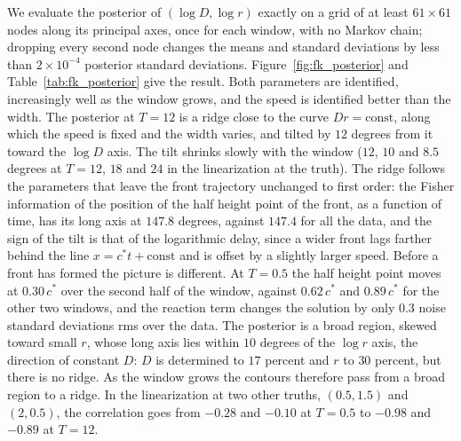We evaluate the posterior of $(\log D,\log r)$ exactly on a grid of at least $61\times61$ nodes along its principal axes, once for each window, with no Markov chain; dropping every second node changes the means and standard deviations by less than $2\times10^{-4}$ posterior standard deviations. Figure~\ref{fig:fk_posterior} and Table~\ref{tab:fk_posterior} give the result. Both parameters are identified, increasingly well as the window grows, and the speed is identified better than the width. The posterior at $T=12$ is a ridge close to the curve $Dr=\mathrm{const}$, along which the speed is fixed and the width varies, and tilted by $12$ degrees from it toward the $\log D$ axis. The tilt shrinks slowly with the window ($12$, $10$ and $8.5$ degrees at $T=12$, $18$ and $24$ in the linearization at the truth). The ridge follows the parameters that leave the front trajectory unchanged to first order: the Fisher information of the position of the half height point of the front, as a function of time, has its long axis at $147.8$ degrees, against $147.4$ for all the data, and the sign of the tilt is that of the logarithmic delay, since a wider front lags farther behind the line $x=c^*t+\mathrm{const}$ and is offset by a slightly larger speed. Before a front has formed the picture is different. At $T=0.5$ the half height point moves at $0.30\,c^*$ over the second half of the window, against $0.62\,c^*$ and $0.89\,c^*$ for the other two windows, and the reaction term changes the solution by only $0.3$ noise standard deviations rms over the data. The posterior is a broad region, skewed toward small $r$, whose long axis lies within $10$ degrees of the $\log r$ axis, the direction of constant $D$: $D$ is determined to $17$ percent and $r$ to $30$ percent, but there is no ridge. As the window grows the contours therefore pass from a broad region to a ridge. In the linearization at two other truths, $(0.5,1.5)$ and $(2,0.5)$, the correlation goes from $-0.28$ and $-0.10$ at $T=0.5$ to $-0.98$ and $-0.89$ at $T=12$.


